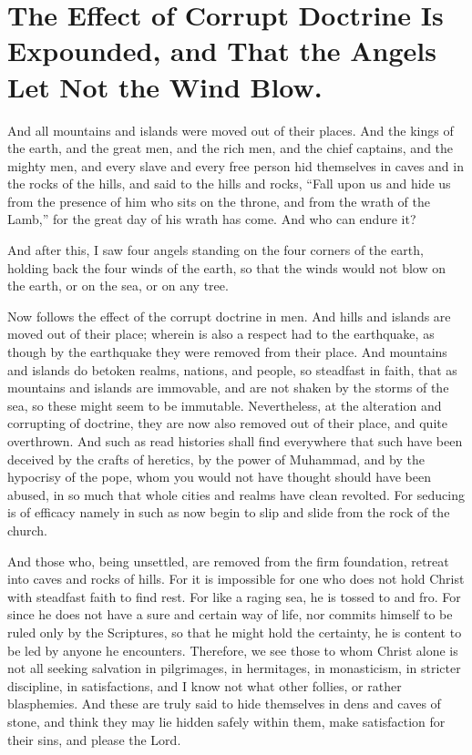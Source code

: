 \chapter[Sermon 34. The Effect of Corrupt Doctrine Is Expounded, and That the Angels Let Not the Wind Blow.]{The Effect of Corrupt Doctrine Is Expounded, and That the Angels Let Not the Wind Blow.}
\label{sermon:034}

And all mountains and islands were moved out of their places. And the kings of the earth, and the great men, and the rich men, and the chief captains, and the mighty men, and every slave and every free person hid themselves in caves and in the rocks of the hills, and said to the hills and rocks, “Fall upon us and hide us from the presence of him who sits on the throne, and from the wrath of the Lamb,” for the great day of his wrath has come. And who can endure it?

And after this, I saw four angels standing on the four corners of the earth, holding back the four winds of the earth, so that the winds would not blow on the earth, or on the sea, or on any tree.

Now follows the effect of the corrupt doctrine in men. And hills and islands are moved out of their place; wherein is also a respect had to the earthquake, as though by the earthquake they were removed from their place. And mountains and islands do betoken realms, nations, and people, so steadfast in faith, that as mountains and islands are immovable, and are not shaken by the storms of the sea, so these might seem to be immutable. Nevertheless, at the alteration and corrupting of doctrine, they are now also removed out of their place, and quite overthrown. And such as read histories shall find everywhere that such have been deceived by the crafts of heretics, by the power of Muhammad, and by the hypocrisy of the pope, whom you would not have thought should have been abused, in so much that whole cities and realms have clean revolted. For seducing is of efficacy namely in such as now begin to slip and slide from the rock of the church.

And those who, being unsettled, are removed from the firm foundation, retreat into caves and rocks of hills. For it is impossible for one who does not hold Christ with steadfast faith to find rest. For like a raging sea, he is tossed to and fro. For since he does not have a sure and certain way of life, nor commits himself to be ruled only by the Scriptures, so that he might hold the certainty, he is content to be led by anyone he encounters. Therefore, we see those to whom Christ alone is not all seeking salvation in pilgrimages, in hermitages, in monasticism, in stricter discipline, in satisfactions, and I know not what other follies, or rather blasphemies. And these are truly said to hide themselves in dens and caves of stone, and think they may lie hidden safely within them, make satisfaction for their sins, and please the Lord.

